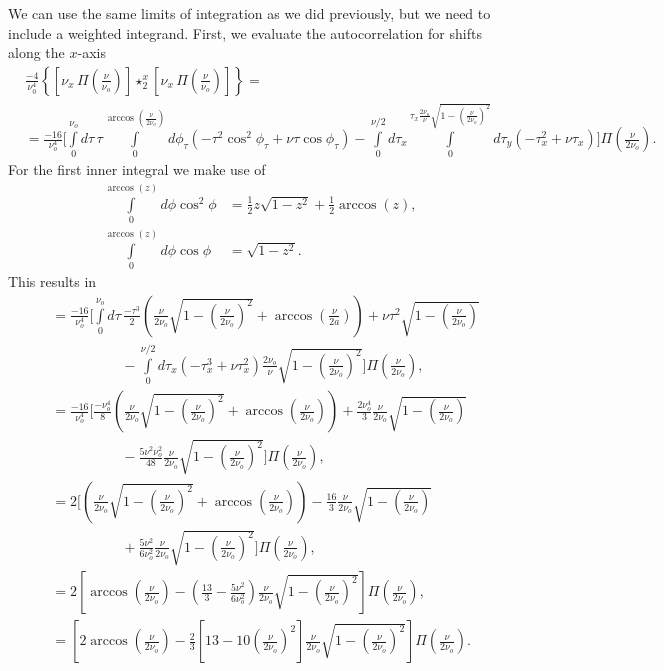 \documentclass[11pt]{article}
\begin{document}
We can use the same limits of integration as we did previously, but we need to
include a weighted integrand. First, we evaluate the autocorrelation for shifts
along the $x$-axis
\begin{align}
  &\frac{-4}{\nu_0^4}\left\{\left[\nu_x\, \Pi\left(\frac{\nu}{\nu_o}\right)\right] \star_2^x \left[\nu_x\, \Pi\left(\frac{\nu}{\nu_o}\right)\right]\right\} = \\
  &=  \frac{-16}{\nu_o^4}\Bigg[\int\limits_0^{\nu_o} d\tau\, \tau \int\limits_0^{\arccos\left(\frac{\nu}{2\nu_o}\right)}d\phi_{\tau}(-\tau^2\cos^2\phi_{\tau} + \nu\tau\cos\phi_{\tau}) - \int\limits_0^{\nu/2}d\tau_x \int\limits_0^{\tau_x \frac{2\nu_o}{\nu}\sqrt{1 - \left(\frac{\nu}{2\nu_o}\right)^2}}d\tau_y(-\tau_x^2 + \nu\tau_x)\Bigg]\Pi\left(\frac{\nu}{2\nu_o}\right).
\end{align}
For the first inner integral we make use of
\begin{align}
  \int\limits_0^{\arccos(z)} d\phi \cos^2\phi &= \frac{1}{2}z\sqrt{1 - z^2} + \frac{1}{2}\arccos(z), \\
  \int\limits_0^{\arccos(z)} d\phi \cos\phi &= \sqrt{1 - z^2}.
\end{align}
This results in
\begin{align}
  &=\frac{-16}{\nu_o^4}\Bigg[\int\limits_0^{\nu_o} d\tau\, \frac{-\tau^3}{2}\left(\frac{\nu}{2\nu_o}\sqrt{1 - \left(\frac{\nu}{2\nu_o}\right)^2} + \arccos\left(\frac{\nu}{2a}\right)\right) + \nu\tau^2\sqrt{1 - \left(\frac{\nu}{2\nu_o}\right)}\nonumber \\ &\hspace{5em}- \int\limits_0^{\nu/2}d\tau_x \left(-\tau_x^3 + \nu\tau_x^2\right)\frac{2 \nu_o}{\nu}\sqrt{1 - \left(\frac{\nu}{2\nu_o}\right)^2}\Bigg]\Pi\left(\frac{\nu}{2\nu_o}\right),\\
  &=  \frac{-16}{\nu_o^4}\Bigg[\frac{-\nu_o^4}{8}\left(\frac{\nu}{2\nu_o}\sqrt{1 - \left(\frac{\nu}{2\nu_o}\right)^2} + \arccos\left(\frac{\nu}{2\nu_o}\right) \right) + \frac{2\nu_o^4}{3}\frac{\nu}{2\nu_o}\sqrt{1 - \left(\frac{\nu}{2\nu_o}\right)}\nonumber \\ &\hspace{5em} - \frac{5\nu^2\nu_o^2}{48}\frac{\nu}{2\nu_o}\sqrt{1 - \left(\frac{\nu}{2\nu_o}\right)^2}\Bigg]\Pi\left(\frac{\nu}{2\nu_o}\right),\\
  &=  2\Bigg[\left(\frac{\nu}{2\nu_o}\sqrt{1 - \left(\frac{\nu}{2\nu_o}\right)^2} + \arccos\left(\frac{\nu}{2\nu_o}\right) \right) - \frac{16}{3}\frac{\nu}{2\nu_o}\sqrt{1 - \left(\frac{\nu}{2\nu_o}\right)}\nonumber \\ &\hspace{5em} + \frac{5\nu^2}{6\nu_o^2}\frac{\nu}{2\nu_o}\sqrt{1 - \left(\frac{\nu}{2\nu_o}\right)^2}\Bigg]\Pi\left(\frac{\nu}{2\nu_o}\right),\\
  &= 2\left[\arccos\left(\frac{\nu}{2\nu_o}\right) - \left(\frac{13}{3} - \frac{5\nu^2}{6\nu_o^2}\right)\frac{\nu}{2\nu_o} \sqrt{1 - \left(\frac{\nu}{2\nu_o}\right)^2}\right]\Pi\left(\frac{\nu}{2\nu_o}\right),\\
  &= \left[2\arccos\left(\frac{\nu}{2\nu_o}\right) - \frac{2}{3}\left[13 - 10\left(\frac{\nu}{2\nu_o}\right)^2\right]\frac{\nu}{2\nu_o} \sqrt{1 - \left(\frac{\nu}{2\nu_o}\right)^2}\right]\Pi\left(\frac{\nu}{2\nu_o}\right).\label{eq:auto1}
\end{align}
\end{document}
